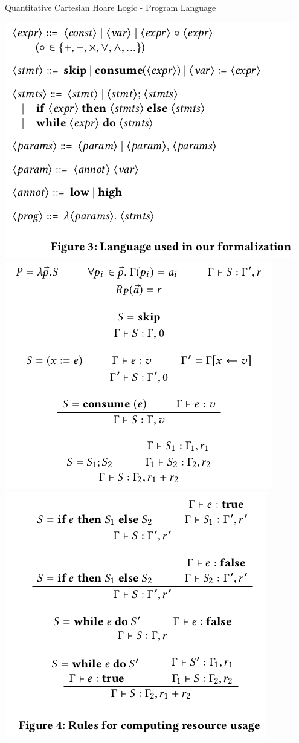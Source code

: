 \documentclass[page number]{beamer}
\begin{document}
\begin{frame}{Quantitative Cartesian Hoare Logic - Program Language}
  \begin{center}
    \includegraphics[scale=0.25]{img_chen/3.png}\\
    \includegraphics[scale=0.3]{img_chen/41.png}
    \includegraphics[scale=0.3]{img_chen/42.png}
  \end{center}
\end{frame}
\end{document}
